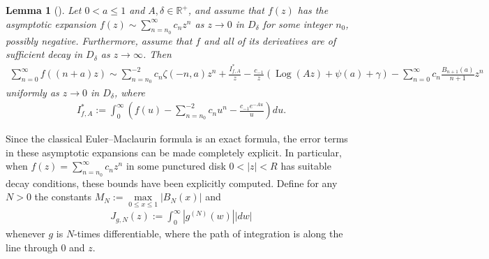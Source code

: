 \documentclass[11pt,reqno]{amsart}
\theoremstyle{definition}
\theoremstyle{plain}
\newtheorem{lemma}[theorem]{Lemma}
\theoremstyle{named}
\newcommand{\R}{\mathbb{R}}
\DeclareMathOperator\Log{Log}
\numberwithin{equation}{section}
\theoremstyle{example}
\begin{document}
\begin{lemma}[{\cite[Lemma 2.2]{BCMO}}] \label{Euler-Maclaurin Sufficient Decay}
Let $0 < a \leq 1$ and $A, \delta \in \R^+$, and assume that $f(z)$ has the asymptotic expansion $f(z) \sim \sum_{n=n_0}^{\infty} c_n z^n$ as $z \rightarrow 0$ in $D_\delta$ for some integer $n_0$, possibly negative. Furthermore, assume that $f$ and all of its derivatives are of sufficient decay in $D_\delta$ as $z \to \infty$. Then
\begin{align*}
	\sum_{n=0}^\infty f((n+a)z)\sim \sum_{n=n_0}^{-2} c_{n} \zeta(-n,a)z^{n}+ \frac{I_{f,A}^*}{z}-\frac{c_{-1}}{z} \left( \Log \left(Az \right) +\psi(a)+\gamma \right)-\sum_{n=0}^\infty c_n \frac{B_{n+1}(a)}{n+1} z^n
\end{align*}
uniformly as $z \rightarrow 0$ in $D_\delta$, where 
\begin{align*}
	I_{f,A}^*:= \int_{0}^{\infty} \left(f(u)-\sum_{n=n_0}^{-2}c_{n}u^n-\frac{c_{-1}e^{-Au}}{u}\right)du.
\end{align*}
\end{lemma}

Since the classical Euler--Maclaurin formula is an exact formula, the error terms in these asymptotic expansions can be made completely explicit. In particular, when $f(z) = \sum_{n = n_0}^\infty c_n z^n$ in some punctured disk $0 < |z| < R$ has suitable decay conditions, these bounds have been explicitly computed. Define for any $N > 0$ the constants $M_N := \max\limits_{0 \leq x \leq 1} \left| B_N(x) \right|$ and
\begin{align*}
    J_{g,N}(z) := \int_0^\infty \left| g^{(N)}(w) \right| |dw|
\end{align*}
whenever $g$ is $N$-times differentiable, where the path of integration is along the line through $0$ and $z$.
\end{document}
